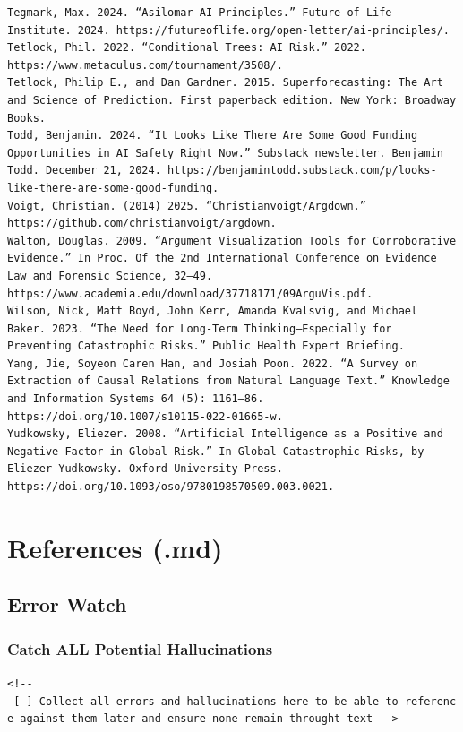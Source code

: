 \documentclass[
  11pt,
  letterpaper,
]{book}
\begin{document}
\begin{verbatim}
Tegmark, Max. 2024. “Asilomar AI Principles.” Future of Life Institute. 2024. https://futureoflife.org/open-letter/ai-principles/.
Tetlock, Phil. 2022. “Conditional Trees: AI Risk.” 2022. https://www.metaculus.com/tournament/3508/.
Tetlock, Philip E., and Dan Gardner. 2015. Superforecasting: The Art and Science of Prediction. First paperback edition. New York: Broadway Books.
Todd, Benjamin. 2024. “It Looks Like There Are Some Good Funding Opportunities in AI Safety Right Now.” Substack newsletter. Benjamin Todd. December 21, 2024. https://benjamintodd.substack.com/p/looks-like-there-are-some-good-funding.
Voigt, Christian. (2014) 2025. “Christianvoigt/Argdown.” https://github.com/christianvoigt/argdown.
Walton, Douglas. 2009. “Argument Visualization Tools for Corroborative Evidence.” In Proc. Of the 2nd International Conference on Evidence Law and Forensic Science, 32–49. https://www.academia.edu/download/37718171/09ArguVis.pdf.
Wilson, Nick, Matt Boyd, John Kerr, Amanda Kvalsvig, and Michael Baker. 2023. “The Need for Long-Term Thinking–Especially for Preventing Catastrophic Risks.” Public Health Expert Briefing.
Yang, Jie, Soyeon Caren Han, and Josiah Poon. 2022. “A Survey on Extraction of Causal Relations from Natural Language Text.” Knowledge and Information Systems 64 (5): 1161–86. https://doi.org/10.1007/s10115-022-01665-w.
Yudkowsky, Eliezer. 2008. “Artificial Intelligence as a Positive and Negative Factor in Global Risk.” In Global Catastrophic Risks, by Eliezer Yudkowsky. Oxford University Press. https://doi.org/10.1093/oso/9780198570509.003.0021.
\end{verbatim}


\chapter{References (.md)}\label{references-.md}

\section{Error Watch}\label{error-watch}

\subsection{Catch ALL Potential
Hallucinations}\label{catch-all-potential-hallucinations}

\texttt{\textless{}!-\/-\ {[}\ {]}\ Collect\ all\ errors\ and\ hallucinations\ here\ to\ be\ able\ to\ reference\ against\ them\ later\ and\ ensure\ none\ remain\ throught\ text\ -\/-\textgreater{}}
\end{document}
